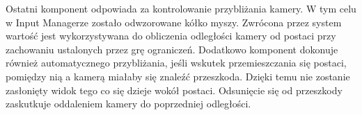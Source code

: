 Ostatni komponent odpowiada za kontrolowanie przybliżania kamery. W tym celu w Input Managerze zostało odwzorowane kółko
myszy. Zwrócona przez system wartość jest wykorzystywana do obliczenia odległości kamery od postaci przy zachowaniu
ustalonych przez grę ograniczeń. Dodatkowo komponent dokonuje również automatycznego przybliżania, jeśli wskutek
przemieszczania się postaci, pomiędzy nią a kamerą miałaby się znaleźć przeszkoda. Dzięki temu nie zostanie zasłonięty
widok tego co się dzieje wokół postaci. Odsunięcie się od przeszkody zaskutkuje oddaleniem kamery do poprzedniej
odległości.
